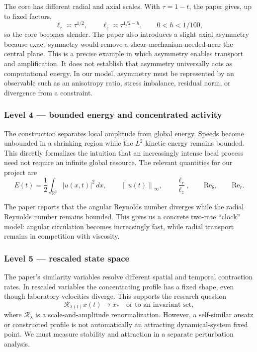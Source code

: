 \documentclass[11pt]{article}
\newcommand{\R}{\mathbb{R}}
\newcommand{\Reynolds}{\mathrm{Re}}
\newcommand{\norm}[1]{\left\lVert #1 \right\rVert}
\newcommand{\abs}[1]{\left\lvert #1 \right\rvert}
\newcommand{\Rescale}{\mathcal{R}}
\newcommand{\Scale}{\lambda}
\theoremstyle{definition}
\theoremstyle{plain}
\theoremstyle{remark}
\begin{document}
The core has different radial and axial scales. With $\tau=1-t$, the paper gives, up to fixed factors,
\begin{equation}
  \ell_r\asymp\tau^{1/2},
  \qquad
  \ell_z\asymp\tau^{1/2-h},
  \qquad 0<h<1/100,
  \label{eq:core-scales}
\end{equation}
so the core becomes slender. The paper also introduces a slight axial asymmetry because exact symmetry would remove a shear mechanism needed near the central plane. This is a precise example in which asymmetry enables transport and amplification. It does not establish that asymmetry universally acts as computational energy. In our model, asymmetry must be represented by an observable such as an anisotropy ratio, stress imbalance, residual norm, or divergence from a constraint.

\subsubsection*{Level 4 --- bounded energy and concentrated activity}

The construction separates local amplitude from global energy. Speeds become unbounded in a shrinking region while the $L^2$ kinetic energy remains bounded. This directly formalizes the intuition that an increasingly intense local process need not require an infinite global resource. The relevant quantities for our project are
\begin{equation}
  E(t)=\frac12\int_{\R^3}\abs{u(x,t)}^2\,dx,
  \qquad
  \norm{u(t)}_\infty,
  \qquad
  \frac{\ell_r}{\ell_z},
  \qquad
  \Reynolds_\theta,
  \qquad
  \Reynolds_r.
  \label{eq:fluid-observables}
\end{equation}

The paper reports that the angular Reynolds number diverges while the radial Reynolds number remains bounded. This gives us a concrete two-rate ``clock'' model: angular circulation becomes increasingly fast, while radial transport remains in competition with viscosity.

\subsubsection*{Level 5 --- rescaled state space}

The paper's similarity variables resolve different spatial and temporal contraction rates. In rescaled variables the concentrating profile has a fixed shape, even though laboratory velocities diverge. This supports the research question
\begin{equation}
  \Rescale_{\Scale(t)}x(t)\longrightarrow x_\ast
  \quad\text{or to an invariant set},
  \label{eq:rescaled-limit}
\end{equation}
where $\Rescale_\Scale$ is a scale-and-amplitude renormalization. However, a self-similar ansatz or constructed profile is not automatically an attracting dynamical-system fixed point. We must measure stability and attraction in a separate perturbation analysis.
\end{document}
